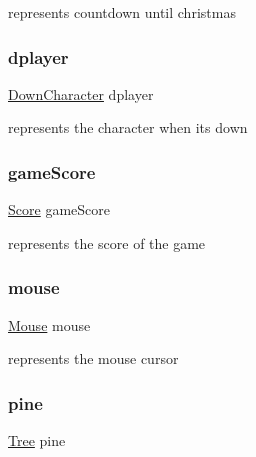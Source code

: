represents countdown until christmas 

\mbox{\label{group___graphics_ga37faf6b2351ee87a7ab6f3ea9c2a02f4}} 
\subsubsection{\texorpdfstring{dplayer}{dplayer}}
{\footnotesize\ttfamily \hyperlink{struct_down_character}{Down\+Character} dplayer\hspace{0.3cm}{\ttfamily [static]}}



represents the character when it\textquotesingle{}s down 

\mbox{\label{group___graphics_ga8e77a1d25d66a81c79d37786002474c5}} 
\subsubsection{\texorpdfstring{game\+Score}{gameScore}}
{\footnotesize\ttfamily \hyperlink{struct_score}{Score} game\+Score\hspace{0.3cm}{\ttfamily [static]}}



represents the score of the game 

\mbox{\label{group___graphics_ga07faa847230d0abd8c3db00e3f8cae7a}} 
\subsubsection{\texorpdfstring{mouse}{mouse}}
{\footnotesize\ttfamily \hyperlink{struct_mouse}{Mouse} mouse\hspace{0.3cm}{\ttfamily [static]}}



represents the mouse cursor 

\mbox{\label{group___graphics_ga98e0c9c163d4fadfce76eebf07b783bf}} 
\subsubsection{\texorpdfstring{pine}{pine}}
{\footnotesize\ttfamily \hyperlink{struct_tree}{Tree} pine\hspace{0.3cm}{\ttfamily [static]}}



